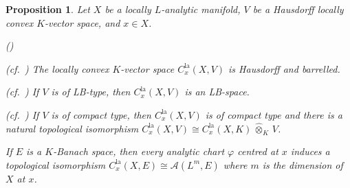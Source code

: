\documentclass[a4paper, reqno, 10pt]{amsart}
\newtheorem{proposition}[theorem]{Proposition}
\theoremstyle{definition}
\newenvironment{altenumerate}
	{\begin{list}
		{\textup{(\theenumi)} }
		{\usecounter{enumi}
			\setlength{\labelwidth}{0pt}
			\setlength{\labelsep}{0pt}
			\setlength{\leftmargin}{0pt}
			\setlength{\itemsep}{0pt}
			\setlength{\topsep}{0pt}
		\renewcommand{\theenumi}{\roman{enumi}}
		}}
	{\end{list}}
\numberwithin{equation}{section}
\newcommand{\cotimes}[1]{{\,\widehat{\otimes}_{#1}\,}}
\newcommand{\la}{{\mathrm{la}}}
\newcommand{\CA}{{\mathcal {A}}}
\begin{document}
\begin{proposition}\label{Prop 1 - Properties of the germs of locally analytic functions}
	Let $X$ be a locally $L$-analytic manifold, $V$ be a Hausdorff locally convex $K$-vector space, and $x\in X$.
	\begin{altenumerate}
		\item
		\textnormal{(cf.\ \cite[Satz 2.3.1]{FeauxdeLacroix99TopDarstpAdischLieGrp})}
		The locally convex $K$-vector space $C^\la_x(X,V)$ is Hausdorff and barrelled.
		\item
		\textnormal{(cf.\ \cite[Satz 2.3.1]{FeauxdeLacroix99TopDarstpAdischLieGrp})}
		If $V$ is of LB-type, then $C^\la_x(X,V)$ is an LB-space.
		\item
		\textnormal{(cf.\ \cite[Satz 2.3.2]{FeauxdeLacroix99TopDarstpAdischLieGrp})}
		If $V$ is of compact type, then $C^\la_x(X,V)$ is of compact type and there is a natural topological isomorphism $C^\la_x(X,V) \cong C^\la_x(X,K) \cotimes{K} V$.
		\item
		If $E$ is a $K$-Banach space, then every analytic chart $\varphi$ centred at $x$ induces a topological isomorphism $C^\la_x (X,E) \cong \CA(L^m,E)$ where $m$ is the dimension of $X$ at $x$.
	\end{altenumerate}
\end{proposition}
\end{document}
